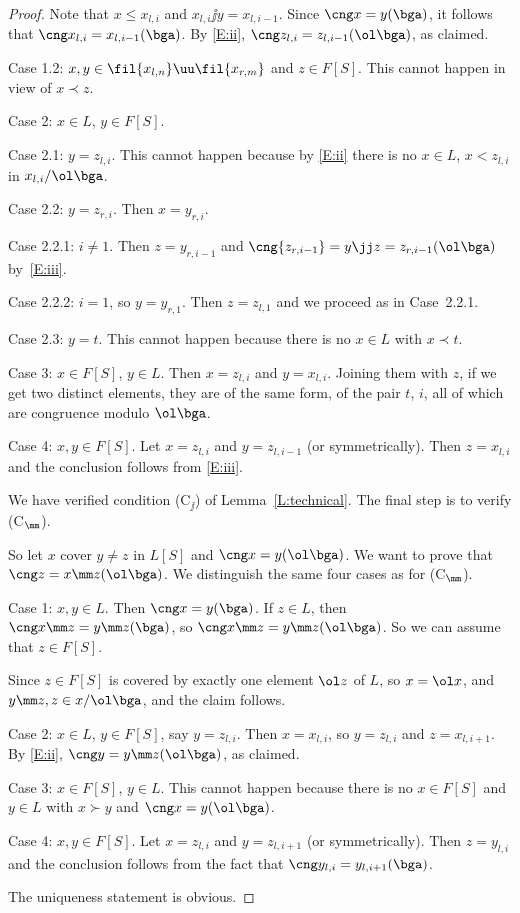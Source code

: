 \documentclass{amsart}
\theoremstyle{plain}
\theoremstyle{definition}
\begin{document}
\begin{proof}
Note that $x \leq x_{l,i}$ and $x_{l,i} \jj y = x_{l,i-1}$.
Since $\cng x=y(\bga)$, 
it follows that $\cng x_{l,i}=x_{l,i-1}(\bga)$.
By \eqref{E:ii}, $\cng z_{l,i}=z_{l,i-1}({\ol \bga})$, as claimed.

\q Case 1.2: $x, y \in \fil {x_{l,n}} \uu \fil {x_{r,m}}$ 
and $z \in F[S]$.
This cannot happen in view of $x \prec z$.

Case 2: $x \in L$, $y \in F[S]$. 

\q Case 2.1: $y = z_{l,i}$. 
This cannot happen because by \eqref{E:ii} there is no
$x \in L$, $x < z_{l,i}$ in $x_{l,i}/{\ol \bga}$.

\q Case 2.2: $y = z_{r,i}$. Then $x = y_{r,i}$.

\qq Case 2.2.1: $i \neq 1$. 
Then $z = y_{r, i-1}$ and $\cng {z_{r,i-1}}={y\jj z = z_{r,i-1}}({\ol \bga})$
by~\eqref{E:iii}.

\qq Case 2.2.2: $i = 1$, so $y = y_{r,1}$. 
Then $z = z_{l, 1}$ and we proceed as in Case~2.2.1.

\q Case 2.3: $y = t$.
This cannot happen because there is no
$x \in L$ with $x \prec t$.

Case 3:  $x \in F[S]$, $y \in L$. 
Then $x = z_{l, i}$ and $y = x_{l, i}$. Joining them with $z$, if we get two distinct elements, they are of the same form, of the pair $t$, $i$, all of which are congruence modulo ${\ol \bga}$. 

Case 4: $x, y \in F[S]$. Let $x = z_{l,i}$ and $y = z_{l,i-1}$ 
(or symmetrically). 
Then $z = x_{l,i}$ and the conclusion follows from \eqref{E:iii}.

We have verified condition (C${}_{\jj}$) of Lemma~\ref{L:technical}.
The final step is to verify (C${}_{\mm}$).

So let $x$ cover $y \neq z$ in $L[S]$ 
and $\cng x = y({\ol \bga})$. 
We want to prove that $\cng z = x \mm z({\ol \bga})$.
We distinguish the same four cases as for (C${}_{\mm}$).

Case 1: $x, y \in L$. Then $\cng x=y(\bga)$.
If $z \in L$, then $\cng x \mm z =y\mm z(\bga)$, 
so $\cng x \mm z =y\mm z({\ol \bga})$. So we can assume that $z \in F[S]$. 

Since $z \in F[S]$ is covered by exactly one element $\ol z$ of $L$,
so $x = \ol x$, and $y \mm z, z \in x/{\ol \bga}$, 
and the claim follows.

Case 2: $x \in L$, $y \in F[S]$, say $y = z_{l,i}$. 
Then $x = x_{l,i}$, so $y = z_{l,i}$ and $z = x_{l,i+1}$.
By \eqref{E:ii}, $\cng y =y \mm z({\ol \bga})$, as claimed.

Case 3:  $x \in F[S]$, $y \in L$. 
This cannot happen because there is no
$x \in F[S]$ and $y \in L$ with $x \succ y$ and $\cng x=y({\ol \bga})$.

Case 4: $x, y \in F[S]$. Let $x = z_{l,i}$ and $y = z_{l,i+1}$ 
(or symmetrically). 
Then $z = y_{l,i}$ and the conclusion follows from the fact that
$\cng y_{l,i} = y_{l,i+1}(\bga)$.

The uniqueness statement is obvious.
\end{proof}
\end{document}
